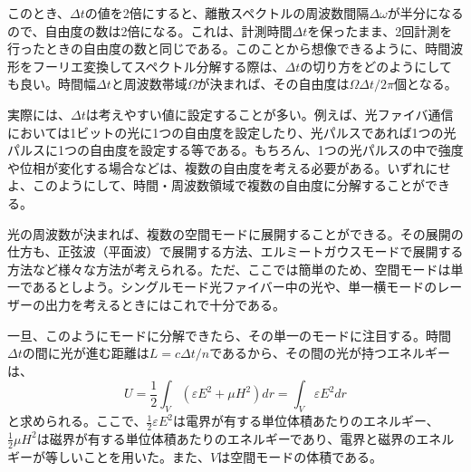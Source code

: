 このとき、$\Delta t$の値を2倍にすると、離散スペクトルの周波数間隔$\Delta \omega$が半分になるので、自由度の数は2倍になる。これは、計測時間$\Delta t$を保ったまま、2回計測を行ったときの自由度の数と同じである。このことから想像できるように、時間波形をフーリエ変換してスペクトル分解する際は、$\Delta t$の切り方をどのようにしても良い。時間幅$\Delta t$と周波数帯域$\Omega$が決まれば、その自由度は$\Omega\Delta t/2\pi$個となる。

実際には、$\Delta t$は考えやすい値に設定することが多い。例えば、光ファイバ通信においては1ビットの光に1つの自由度を設定したり、光パルスであれば1つの光パルスに1つの自由度を設定する等である。もちろん、1つの光パルスの中で強度や位相が変化する場合などは、複数の自由度を考える必要がある。いずれにせよ、このようにして、時間・周波数領域で複数の自由度に分解することができる。

光の周波数が決まれば、複数の空間モードに展開することができる。その展開の仕方も、正弦波（平面波）で展開する方法、エルミートガウスモードで展開する方法など様々な方法が考えられる。ただ、ここでは簡単のため、空間モードは単一であるとしよう。シングルモード光ファイバー中の光や、単一横モードのレーザーの出力を考えるときにはこれで十分である。

一旦、このようにモードに分解できたら、その単一のモードに注目する。時間$\Delta t$の間に光が進む距離は$L = c\Delta t/n$であるから、その間の光が持つエネルギーは、
\begin{equation}
U = \frac 1 2 \int_V \left(\varepsilon E^2 + \mu H^2\right)dr = \int_V \varepsilon E^2 dr
\end{equation}
と求められる。ここで、$\frac 1 2 \varepsilon E^2$は電界が有する単位体積あたりのエネルギー、$\frac 1 2 \mu H^2$は磁界が有する単位体積あたりのエネルギーであり、電界と磁界のエネルギーが等しいことを用いた。また、$V$は空間モードの体積である。



